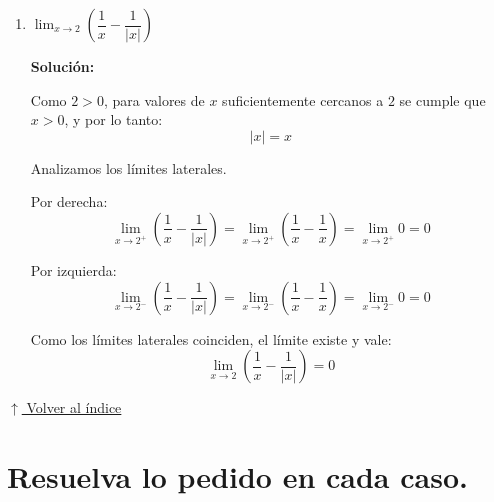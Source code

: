 \documentclass[12pt]{article}
\newcommand{\solucion}{%
    \vspace{0.8em}%
    \textbf{Solución:}%
}
\newcommand{\volverindice}{%
    \vspace{1em}%
    \begin{flushright}%
        \hyperlink{indice}{\small $\uparrow$ Volver al índice}%
    \end{flushright}%
}
\begin{document}
\begin{enumerate}[label=\alph*)]
    Por izquierda:
    \[
    \lim_{x\to-6^-}\frac{2x+12}{|x+6|}
    =
    \lim_{x\to-6^-}\frac{2x+12}{-(x+6)}
    \]

    \[
    =
    \lim_{x\to-6^-}\frac{2(x+6)}{-(x+6)}
    =
    -2
    \]

    Como los límites laterales no coinciden:
    \[
    \lim_{x\to-6^-}\frac{2x+12}{|x+6|}
    \neq
    \lim_{x\to-6^+}\frac{2x+12}{|x+6|}
    \]

    entonces el límite no existe:
    \[
    \boxed{
    \lim_{x\to-6}\frac{2x+12}{|x+6|}
    \text{ no existe}
    }
    \]

    \item $\lim_{x \to 2} \left(\dfrac{1}{x} - \dfrac{1}{|x|}\right)$

    \solucion

    Como $2>0$, para valores de $x$ suficientemente cercanos a $2$ se cumple que $x>0$, y por lo tanto:
    \[
    |x|=x
    \]

    Analizamos los límites laterales.

    Por derecha:
    \[
    \lim_{x\to2^+}\left(\frac{1}{x}-\frac{1}{|x|}\right)
    =
    \lim_{x\to2^+}\left(\frac{1}{x}-\frac{1}{x}\right)
    =
    \lim_{x\to2^+}0
    =
    0
    \]

    Por izquierda:
    \[
    \lim_{x\to2^-}\left(\frac{1}{x}-\frac{1}{|x|}\right)
    =
    \lim_{x\to2^-}\left(\frac{1}{x}-\frac{1}{x}\right)
    =
    \lim_{x\to2^-}0
    =
    0
    \]

    Como los límites laterales coinciden, el límite existe y vale:
    \[
    \boxed{
    \lim_{x\to2}\left(\frac{1}{x}-\frac{1}{|x|}\right)=0
    }
    \]
\end{enumerate}

\volverindice
\newpage

\section[Límites de funciones definidas por partes]{Resuelva lo pedido en cada caso.}
\end{document}

